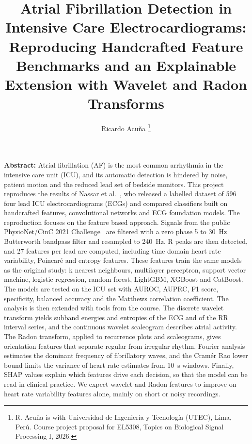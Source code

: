 \documentclass[journal]{IEEEtran}
\begin{document}
\title{Atrial Fibrillation Detection in Intensive Care Electrocardiograms: Reproducing Handcrafted Feature Benchmarks and an Explainable Extension with Wavelet and Radon Transforms}

\author{Ricardo Acuña
\thanks{R. Acuña is with Universidad de Ingeniería y Tecnología (UTEC), Lima, Perú. Course project proposal for EL5308, Topics on Biological Signal Processing I, 2026.}}

\maketitle

\noindent\textbf{Abstract:} Atrial fibrillation (AF) is the most common arrhythmia in the intensive care unit (ICU), and its automatic detection is hindered by noise, patient motion and the reduced lead set of bedside monitors. This project reproduces the results of Nassar et al.~\cite{nassar2025}, who released a labelled dataset of 596 four lead ICU electrocardiograms (ECGs) and compared classifiers built on handcrafted features, convolutional networks and ECG foundation models. The reproduction focuses on the feature based approach. Signals from the public PhysioNet/CinC 2021 Challenge~\cite{reyna2021} are filtered with a zero phase 5 to 30~Hz Butterworth bandpass filter and resampled to 240~Hz. R peaks are then detected, and 27 features per lead are computed, including time domain heart rate variability, Poincaré and entropy features. These features train the same models as the original study: k nearest neighbours, multilayer perceptron, support vector machine, logistic regression, random forest, LightGBM, XGBoost and CatBoost. The models are tested on the ICU set with AUROC, AUPRC, F1 score, specificity, balanced accuracy and the Matthews correlation coefficient. The analysis is then extended with tools from the course. The discrete wavelet transform yields subband energies and entropies of the ECG and of the RR interval series, and the continuous wavelet scaleogram describes atrial activity. The Radon transform, applied to recurrence plots and scaleograms, gives orientation features that separate regular from irregular rhythm. Fourier analysis estimates the dominant frequency of fibrillatory waves, and the Cramér Rao lower bound limits the variance of heart rate estimates from 10~s windows. Finally, SHAP values explain which features drive each decision, so that the model can be read in clinical practice. We expect wavelet and Radon features to improve on heart rate variability features alone, mainly on short or noisy recordings.
\end{document}
